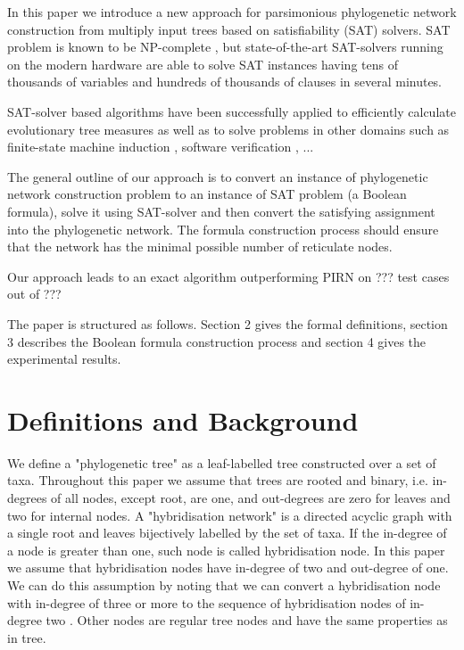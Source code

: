 \documentclass[runningheads, envcountsame, a4paper]{llncs}
\begin{document}
In this paper we introduce a new approach for parsimonious
phylogenetic network construction from multiply input trees based on satisfiability (SAT) solvers.
SAT problem is known to be NP-complete \cite{bordewich2007computing}, but state-of-the-art SAT-solvers running on the modern hardware 
are able to solve SAT instances having tens of thousands of variables and hundreds of thousands of clauses in several minutes.

SAT-solver based algorithms have been successfully applied to efficiently calculate evolutionary tree measures \cite{bonet2009efficiently}
as well as to solve problems in other domains such as
finite-state machine induction \cite{heule2010exact}, software verification \cite{}, ...

The general outline of our approach is to convert an instance of phylogenetic network construction 
problem to an instance of SAT problem (a Boolean formula), solve it using SAT-solver and then convert 
the satisfying assignment into the phylogenetic network. The formula construction process should ensure that
the network has the minimal possible number of reticulate nodes.

Our approach leads to an exact algorithm outperforming PIRN on ??? test cases out of ???

The paper is structured as follows. Section 2 gives the formal definitions, section 3 describes the Boolean formula
construction process and section 4 gives the experimental results.

\section{Definitions and Background}

We define a "phylogenetic tree" as a leaf-labelled tree constructed over a set of taxa. 
Throughout this paper we assume that trees are rooted and binary, i.e. in-degrees of all nodes, except root, are one, 
and out-degrees are zero for leaves and two for internal nodes. A "hybridisation network" is a directed acyclic graph 
with a single root and leaves bijectively labelled by the set of taxa. If the in-degree of a node is greater than one, 
such node is called hybridisation node. In this paper we assume that hybridisation nodes have in-degree of two and 
out-degree of one. We can do this assumption by noting that we can convert a hybridisation node with in-degree 
of three or more to the sequence of hybridisation nodes of in-degree two \cite{wu2010close}. Other nodes are regular 
tree nodes and have the same properties as in tree.
\end{document}
